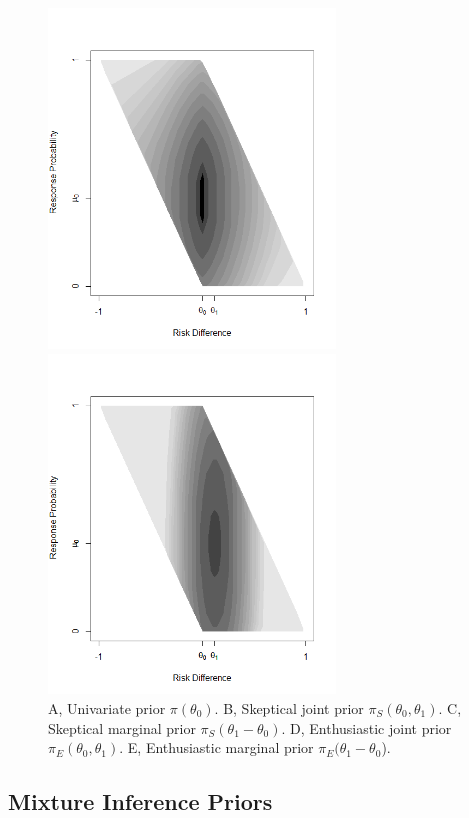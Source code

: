 \documentclass[12pt]{article}
\begin{document}
\begin{figure}\begin{center}

\includegraphics[width=3in]{./FIGURES/figure5a.png}

\includegraphics[width=3in]{./FIGURES/figure5b.png}
\caption{A, Univariate prior $\pi(\theta_0)$. B, Skeptical joint prior $\pi_S(\theta_0,\theta_1)$. C, Skeptical marginal prior $\pi_S(\theta_1-\theta_0)$. D, Enthusiastic joint prior $\pi_E(\theta_0,\theta_1)$. E, Enthusiastic marginal prior $\pi_E(\theta_1-\theta_0$).}
\label{fig:figure5}
 \end{center}\end{figure}
\subsection{Mixture Inference Priors}
\end{document}
